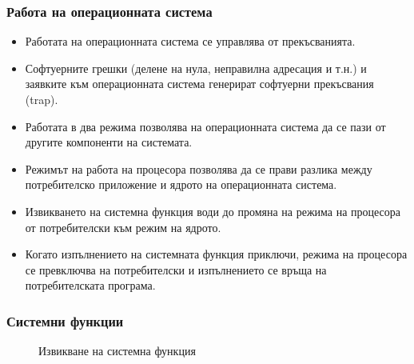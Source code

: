 \documentclass[ignorenonframetext, hyperref=unicode]{beamer}
\begin{document}
\begin{frame}
\frametitle{Работа на операционната система}
\begin{itemize}
\item Работата на операционната система се управлява от прекъсванията.
\item Софтуерните грешки (делене на нула, неправилна адресация и т.н.) и
заявките към операционната система генерират софтуерни прекъсвания (trap).
\item Работата в два режима позволява на операционната система да се пази от
другите компоненти на системата.
\item Режимът на работа на процесора позволява да се прави разлика между
потребителско приложение и ядрото на операционната система.
\item Извикването на системна функция води до промяна на режима на процесора от
потребителски към режим на ядрото. 
\item Когато изпълнението на системната функция
приключи, режима на процесора се превключва на потребителски и изпълнението се
връща на потребителската
програма.
\end{itemize}
\end{frame}

\begin{frame}
\frametitle{Системни функции}
\begin{figure}[h]
\center
{}
\caption{Извикване на системна функция}
\end{figure}
\end{frame}
\end{document}
